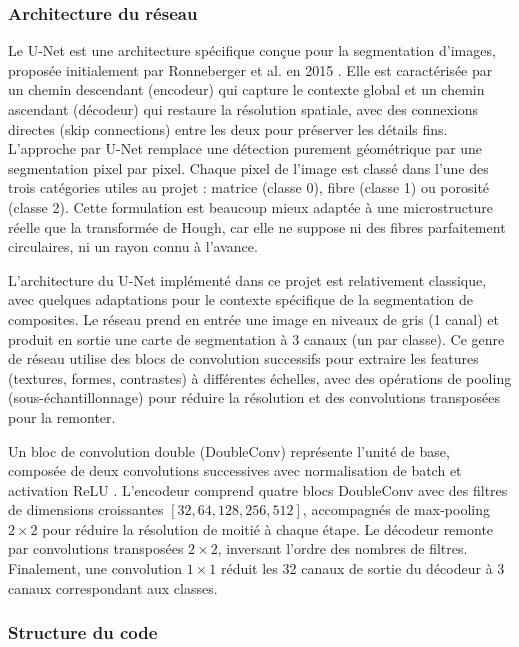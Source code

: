 \documentclass[a4paper,11pt]{article}
\begin{document}
\subsubsection*{Architecture du réseau}
Le U-Net est une architecture spécifique conçue pour la segmentation d'images, proposée initialement par Ronneberger et al. en 2015 \cite{RonnebergerUNet}. Elle est caractérisée par un chemin descendant (encodeur) qui capture le contexte global et un chemin ascendant (décodeur) qui restaure la résolution spatiale, avec des connexions directes (skip connections) entre les deux pour préserver les détails fins. L'approche par U-Net remplace une détection purement géométrique par une segmentation pixel par pixel. Chaque pixel de l'image est classé dans l'une des trois catégories utiles au projet : matrice (classe 0), fibre (classe 1) ou porosité (classe 2). Cette formulation est beaucoup mieux adaptée à une microstructure réelle que la transformée de Hough, car elle ne suppose ni des fibres parfaitement circulaires, ni un rayon connu à l'avance.

L'architecture du U-Net implémenté dans ce projet est relativement classique, avec quelques adaptations pour le contexte spécifique de la segmentation de composites. Le réseau prend en entrée une image en niveaux de gris (1 canal) et produit en sortie une carte de segmentation à 3 canaux (un par classe). Ce genre de réseau utilise des blocs de convolution successifs pour extraire les features (textures, formes, contrastes) à différentes échelles, avec des opérations de pooling (sous-échantillonnage) pour réduire la résolution et des convolutions transposées pour la remonter.

Un bloc de convolution double (DoubleConv) représente l'unité de base, composée de deux convolutions successives avec normalisation de batch et activation ReLU \cite{RonnebergerUNet}. L'encodeur comprend quatre blocs DoubleConv avec des filtres de dimensions croissantes \([32, 64, 128, 256, 512]\), accompagnés de max-pooling $2\times2$ pour réduire la résolution de moitié à chaque étape. Le décodeur remonte par convolutions transposées $2\times2$, inversant l'ordre des nombres de filtres. Finalement, une convolution $1\times1$ réduit les 32 canaux de sortie du décodeur à 3 canaux correspondant aux classes. \\

\subsubsection{Structure du code}
\end{document}
